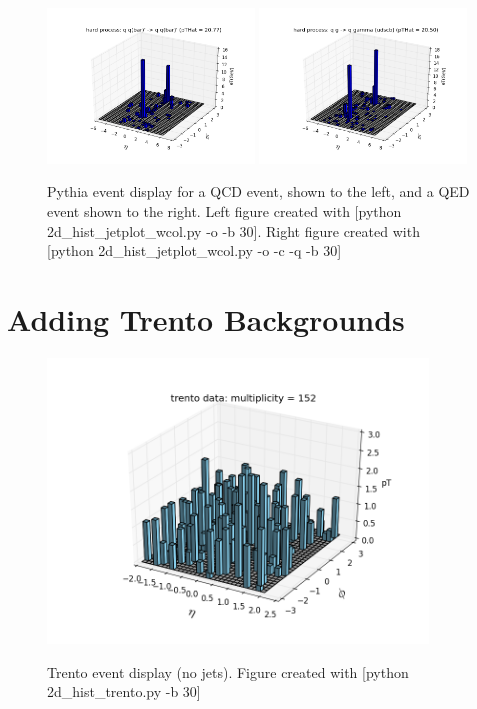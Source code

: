 \documentclass[11pt]{article}
\begin{document}
\begin{figure}[h]
\begin{center}
\includegraphics[width=0.49\textwidth]{2d_hist_jetplot.png}
\includegraphics[width=0.49\textwidth]{2d_hist_jetplot2.png}
\label{fig_label}
\caption{Pythia event display for a QCD event, shown to the left, and a QED event shown to the right.  Left figure created with [python 2d\_hist\_jetplot\_wcol.py -o -b 30]. Right figure created with [python 2d\_hist\_jetplot\_wcol.py -o -c -q -b 30]}
\end{center}
\end{figure}

\section{Adding Trento Backgrounds}
%
%


\begin{figure}[h]
\begin{center}
\includegraphics[width=0.9\textwidth]{2d_hist_trento.png}
\label{fig_label}
\caption{Trento event display (no jets).  Figure created with [python 2d\_hist\_trento.py -b 30]}
\end{center}
\end{figure}
\end{document}

